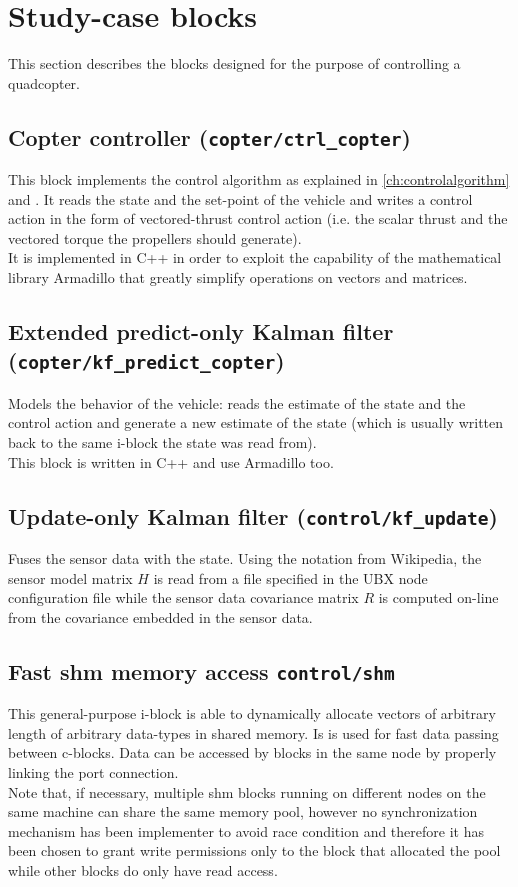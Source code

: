 \section{Study-case blocks}
This section describes the blocks designed for the purpose of controlling a quadcopter.

\subsection{Copter controller (\texttt{copter/ctrl\_copter})}
This block implements the control algorithm as explained in \autoref{ch:controlalgorithm} and \autocite{marconi}. It reads the state and the set-point of the vehicle and writes a control action in the form of vectored-thrust control action (i.e. the scalar thrust and the vectored torque the propellers should generate).\\
It is implemented in C++ in order to exploit the capability of the mathematical library Armadillo that greatly simplify operations on vectors and matrices. 

\subsection{Extended predict-only Kalman filter (\texttt{copter/kf\_predict\_copter})}
Models the behavior of the vehicle: reads the estimate of the state and the control action and generate a new estimate of the state (which is usually written back to the same i-block the state was read from).\\
This block is written in C++ and use Armadillo too.

\subsection{Update-only Kalman filter (\texttt{control/kf\_update})}
Fuses the sensor data with the state. Using the notation from Wikipedia\autocite{bib:wiki:kalmann}, the sensor model matrix $ H $ is read from a file specified in the UBX node configuration file while the sensor data covariance matrix $ R $ is computed on-line from the covariance embedded in the sensor data.

\subsection{Fast shm memory access \texttt{control/shm}}
This general-purpose i-block is able to dynamically allocate vectors of arbitrary length of arbitrary data-types in shared memory. Is is used for fast data passing between c-blocks. Data can be accessed by blocks in the same node by properly linking the port connection.\\
Note that, if necessary, multiple shm blocks running on different nodes on the same machine can share the same memory pool, however no synchronization mechanism has been implementer to avoid race condition and therefore it has been chosen to grant write permissions only to the block that allocated the pool while other blocks do only have read access.

